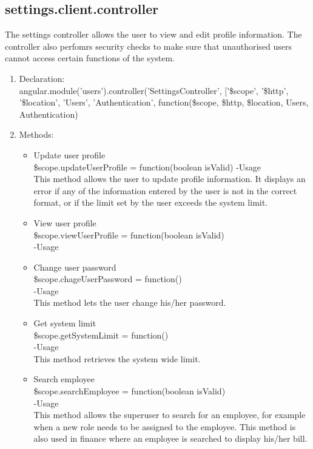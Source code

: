 \documentclass[a4paper,12pt]{article}
\begin{document}
\subsection{settings.client.controller}
 The settings controller allows the user to view and edit profile information. The controller also perfomrs security checks to make sure that unauthorised users cannot access certain functions of the system.
 \begin{enumerate}
 \item Declaration:\\angular.module('users').controller('SettingsController', ['\$scope', '\$http', '\$location', 'Users', 'Authentication',
	function(\$scope, \$http, \$location, Users, Authentication) 
	\item Methods:\\
	\begin{itemize}
	\item Update user profile\\
 \$scope.updateUserProfile = function(boolean isValid)
 -Usage\\
 This method allows the user to update profile information. It displays an error if any of the information entered by the user is not in the correct format, or if the limit set by the user exceeds the system limit.
\item View user profile\\
 \$scope.viewUserProfile = function(boolean isValid)\\
-Usage\\

\item Change user password\\
 \$scope.chageUserPassword = function()\\
-Usage\\
This method lets the user change his/her password.

\item Get system limit\\
 \$scope.getSystemLimit = function()\\
-Usage\\
This method retrieves the system wide limit.

\item Search employee\\
 \$scope.searchEmployee = function(boolean isValid)\\
-Usage\\
This method allows the superuser to search for an employee, for example when a new role needs to be assigned to the employee.
This method is also used in finance where an employee is searched to display his/her bill.


\end{itemize}
\end{enumerate}
\end{document}
